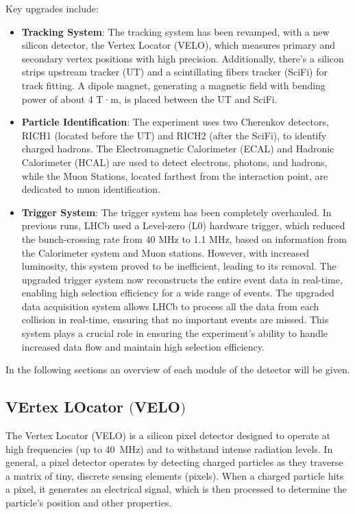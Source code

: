 Key upgrades include:
\begin{itemize}
\item \textbf{Tracking System}: The tracking system has been revamped, with a new silicon detector, the Vertex Locator (VELO), which measures primary and secondary vertex positions with high precision. Additionally, there's a silicon strips upstream tracker (UT) and a scintillating fibers tracker (SciFi) for track fitting. A dipole magnet, generating a magnetic field with bending power of about 4 T·m, is placed between the UT and SciFi.

\item \textbf{Particle Identification}: The experiment uses two Cherenkov detectors, RICH1 (located before the UT) and RICH2 (after the SciFi), to identify charged hadrons. The Electromagnetic Calorimeter (ECAL) and Hadronic Calorimeter (HCAL) are used to detect electrons, photons, and hadrons, while the Muon Stations, located farthest from the interaction point, are dedicated to muon identification.

\item \textbf{Trigger System}: The trigger system has been completely overhauled. In previous runs, LHCb used a Level-zero (L$0$) hardware trigger, which reduced the bunch-crossing rate from 40 MHz to 1.1 MHz, based on information from the Calorimeter system and Muon stations. However, with increased luminosity, this system proved to be inefficient, leading to its removal. The upgraded trigger system now reconstructs the entire event data in real-time, enabling high selection efficiency for a wide range of events. The upgraded data acquisition system allows LHCb to process all the data from each collision in real-time, ensuring that no important events are missed. This system plays a crucial role in ensuring the experiment's ability to handle increased data flow and maintain high selection efficiency.
\end{itemize}
In the following sections an overview of each module of the detector will be given.

\subsection[VErtex LOcator]{VErtex LOcator $\bigl($VELO$\bigr)$}
The Vertex Locator (VELO)\cite{Bediaga:2013tje} is a silicon pixel detector designed to operate at high frequencies (up to \SI{40}{\mega\hertz}) and to withstand intense radiation levels. In general, a pixel detector operates by detecting charged particles as they traverse a matrix of tiny, discrete sensing elements (pixels). When a charged particle hits a pixel, it generates an electrical signal, which is then processed to determine the particle's position and other properties.  

